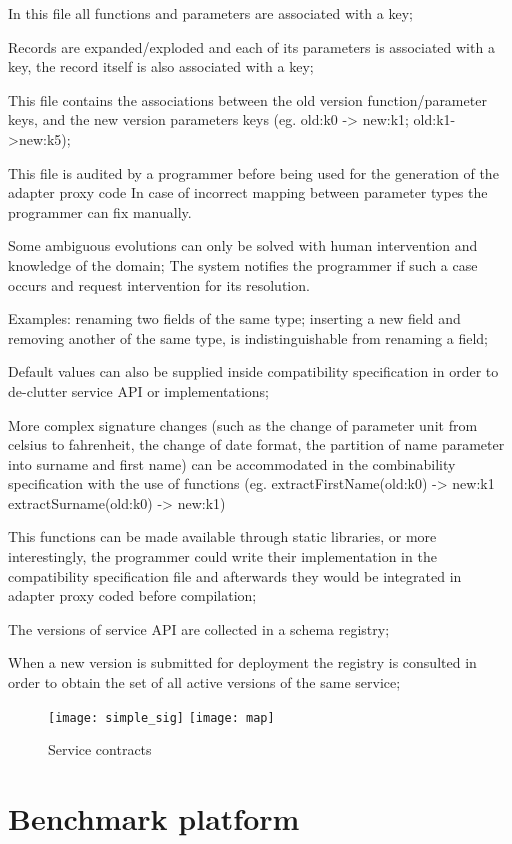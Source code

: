 In this file all functions and parameters are associated with a key;

Records are expanded/exploded and each of its parameters is associated with a key, the record itself is also associated with a key;

This file contains the associations between the old version function/parameter keys, and the new version parameters keys (eg. old:k0 -> new:k1; old:k1->new:k5);

This file is audited by a programmer before being used for the generation of the adapter proxy code
In case of incorrect mapping between parameter types the programmer can fix manually.

Some ambiguous evolutions can only be solved with human intervention and knowledge of the domain;
The system notifies the programmer if such a case occurs and request intervention for its resolution.

Examples:
renaming two fields of the same type;
inserting a new field and removing another of the same type, is indistinguishable from renaming a field;

Default values can also be supplied inside compatibility specification in order to de-clutter service API or implementations;

More complex signature changes (such as the change of parameter unit from celsius to fahrenheit, the change of date format, the partition of name parameter into surname and first name)
can be accommodated in the combinability specification with the use of functions (eg. extractFirstName(old:k0) -> new:k1  extractSurname(old:k0) -> new:k1)

This functions can be made available through static libraries, or more interestingly, the programmer could write their implementation in the compatibility specification file
and afterwards they would be integrated in adapter proxy coded before compilation;

The versions of service API are collected in a schema registry;

When a new version is submitted for deployment the registry is consulted in order to obtain the set of all active versions of the same service;

\begin{figure}[htbp]
    \centering
    \texttt{[image: simple\_sig]}
    \texttt{[image: map]}
    \caption{Service contracts}
    \label{fig:simple}
\end{figure}

\section{Benchmark platform} %
\label{sec:benchmark_platform}

